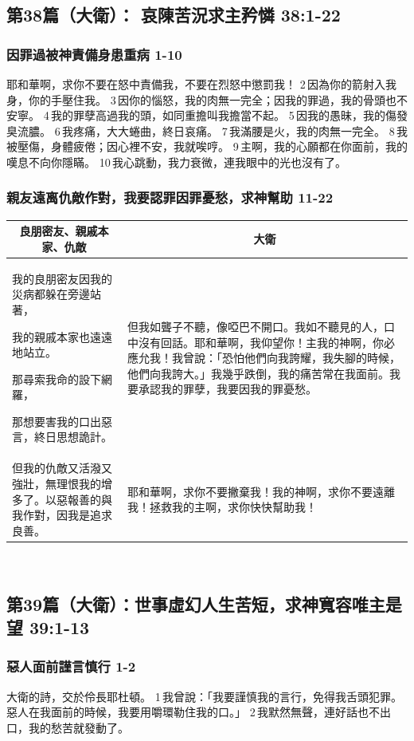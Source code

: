 \subsection{第38篇（大衛）： 哀陳苦況求主矜憐 38:1-22}
\subsubsection{因罪過被神責備身患重病 1-10}
耶和華啊，求你不要在怒中責備我，不要在烈怒中懲罰我！
2 因為你的箭射入我身，你的手壓住我。
3 因你的惱怒，我的肉無一完全；因我的罪過，我的骨頭也不安寧。
4 我的罪孽高過我的頭，如同重擔叫我擔當不起。
5 因我的愚昧，我的傷發臭流膿。
6 我疼痛，大大蜷曲，終日哀痛。
7 我滿腰是火，我的肉無一完全。
8 我被壓傷，身體疲倦；因心裡不安，我就唉哼。
9 主啊，我的心願都在你面前，我的嘆息不向你隱瞞。
10 我心跳動，我力衰微，連我眼中的光也沒有了。
\subsubsection{親友遠离仇敵作對，我要認罪因罪憂愁，求神幫助 11-22}
\begin{table}[H]
\centering
\begin{tabular}{p{7cm}|p{10.25cm}}\hline\hline
\multicolumn{1}{c|}{良朋密友、親戚本家、仇敵}&\multicolumn{1}{c}{大衛}\\\hline
我的良朋密友因我的災病都躲在旁邊站著，

我的親戚本家也遠遠地站立。

那尋索我命的設下網羅，

那想要害我的口出惡言，終日思想詭計。
&但我如聾子不聽，像啞巴不開口。我如不聽見的人，口中沒有回話。耶和華啊，我仰望你！主我的神啊，你必應允我！我曾說：「恐怕他們向我誇耀，我失腳的時候，他們向我誇大。」我幾乎跌倒，我的痛苦常在我面前。我要承認我的罪孽，我要因我的罪憂愁。\\\hline
但我的仇敵又活潑又強壯，無理恨我的增多了。以惡報善的與我作對，因我是追求良善。&耶和華啊，求你不要撇棄我！我的神啊，求你不要遠離我！拯救我的主啊，求你快快幫助我！\\\hline
\end{tabular}
\end{table} 


\subsection{第39篇（大衛）：世事虛幻人生苦短，求神寬容唯主是望 39:1-13}
\subsubsection{惡人面前謹言慎行 1-2}
大衛的詩，交於伶長耶杜頓。
1 我曾說：「我要謹慎我的言行，免得我舌頭犯罪。惡人在我面前的時候，我要用嚼環勒住我的口。」
2 我默然無聲，連好話也不出口，我的愁苦就發動了。
